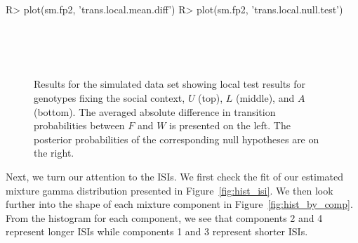 \begin{example}
R> plot(sm.fp2, 'trans.local.mean.diff')
R> plot(sm.fp2, 'trans.local.null.test')
\end{example}

\begin{figure}[!ht]
\centering
{}\\
\\
\\
\caption{Results for the simulated  data set showing local test results for genotypes fixing the social context, $U$ (top), $L$ (middle), and $A$ (bottom).
The averaged absolute difference in transition probabilities between $F$ and $W$ is presented on the left.
The posterior probabilities of the corresponding null hypotheses are on the right.
 }
\label{fig:local}
\end{figure}


Next, we turn our attention to the ISIs. 
We first check the fit of our estimated mixture gamma distribution presented in Figure~\ref{fig:hist_isi}. 
We then look further into the shape of each mixture component in Figure~\ref{fig:hist_by_comp}. 
{From the histogram for each component, we see that components 2 and 4 represent longer ISIs while components 1 and 3 represent shorter ISIs.}


